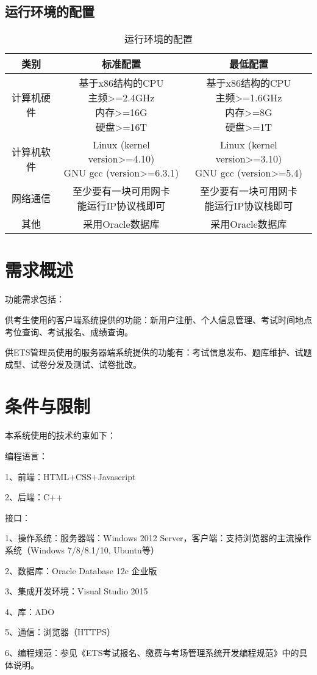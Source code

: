 \subsection{运行环境的配置}
\begin{table}[htbp]
\centering
\caption{运行环境的配置} \label{tab:operation-environment}
\begin{tabular}{|c|c|c|}
    \hline
    类别 & 标准配置 & 最低配置 \\
    \hline
    计算机硬件 & \tabincell{c}{基于x86结构的CPU\\ 主频>=2.4GHz\\ 内存>=16G\\ 硬盘>=16T} & \tabincell{c}{基于x86结构的CPU\\ 主频>=1.6GHz\\ 内存>=8G\\ 硬盘>=1T} \\
    \hline
    计算机软件 & \tabincell{c}{Linux (kernel version>=4.10)\\ GNU gcc (version>=6.3.1)} & \tabincell{c}{Linux (kernel version>=3.10)\\ GNU gcc (version>=5.4)} \\
    \hline
    网络通信 & \tabincell{c}{至少要有一块可用网卡\\ 能运行IP协议栈即可} & \tabincell{c}{至少要有一块可用网卡\\ 能运行IP协议栈即可} \\
    \hline
    其他 & 采用Oracle数据库 & 采用Oracle数据库 \\
    \hline

\end{tabular}
\end{table}

\section{需求概述}
功能需求包括：

供考生使用的客户端系统提供的功能：新用户注册、个人信息管理、考试时间地点考位查询、考试报名、成绩查询。

供ETS管理员使用的服务器端系统提供的功能有：考试信息发布、题库维护、试题成型、试卷分发及测试、试卷批改。


\section{条件与限制}
本系统使用的技术约束如下：

编程语言：

1、前端：HTML+CSS+Javascript

2、后端：C++

接口：

1、操作系统：服务器端：Windows 2012 Server，客户端：支持浏览器的主流操作系统（Windows 7/8/8.1/10, Ubuntu等）
	
2、数据库：Oracle Database 12c 企业版
	
3、集成开发环境：Visual Studio 2015
	
4、库：ADO
	
5、通信：浏览器（HTTPS）
	
6、编程规范：参见《ETS考试报名、缴费与考场管理系统开发编程规范》中的具体说明。

